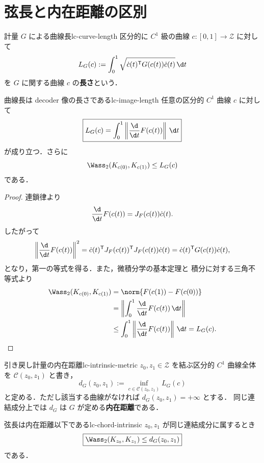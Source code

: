 \section{弦長と内在距離の区別}
\label{sec:lc-intrinsic-distance}

\begin{definition}{計量 $G$ による曲線長}{lc-curve-length}
  区分的に $C^1$ 級の曲線 $c\colon[0,1]\to\mathcal{Z}$ に対して
  \[
    L_G(c)
    :=\int_0^1
      \sqrt{\dot c(t)^{\mathsf T}G(c(t))\dot c(t)}\,\d t
  \]
  を $G$ に関する曲線 $c$ の\textbf{長さ}という．
\end{definition}

\begin{proposition}{曲線長は decoder 像の長さである}{lc-image-length}
  任意の区分的 $C^1$ 曲線 $c$ に対して
  \[
    \boxed{
      L_G(c)=\int_0^1\left\|\frac{\d}{\d t}F(c(t))\right\|\,\d t
    }
  \]
  が成り立つ．さらに
  \[
    \Wass_2(K_{c(0)},K_{c(1)})\leq L_G(c)
  \]
  である．
\end{proposition}

\begin{proof}
  連鎖律より
  \[
    \frac{\d}{\d t}F(c(t))=J_F(c(t))\dot c(t).
  \]
  したがって
  \[
    \left\|\frac{\d}{\d t}F(c(t))\right\|^2
    =\dot c(t)^{\mathsf T}J_F(c(t))^{\mathsf T}
      J_F(c(t))\dot c(t)
    =\dot c(t)^{\mathsf T}G(c(t))\dot c(t),
  \]
  となり，第一の等式を得る．また，微積分学の基本定理と
  積分に対する三角不等式より
  \[
    \begin{aligned}
      \Wass_2(K_{c(0)},K_{c(1)})
      &=\norm{F(c(1))-F(c(0))}\\
      &=\left\|\int_0^1\frac{\d}{\d t}F(c(t))\,\d t\right\|\\
      &\leq\int_0^1
        \left\|\frac{\d}{\d t}F(c(t))\right\|\,\d t
       =L_G(c).
    \end{aligned}
  \]
\end{proof}

\begin{definition}{引き戻し計量の内在距離}{lc-intrinsic-metric}
  $z_0,z_1\in\mathcal{Z}$ を結ぶ区分的 $C^1$ 曲線全体を
  $\mathcal{C}(z_0,z_1)$ と書き，
  \[
    d_G(z_0,z_1)
    :=\inf_{c\in\mathcal{C}(z_0,z_1)}L_G(c)
  \]
  と定める．ただし該当する曲線がなければ $d_G(z_0,z_1)=+\infty$ とする．
  同じ連結成分上では $d_G$ は $G$ が定める\textbf{内在距離}である．
\end{definition}

\begin{corollary}{弦長は内在距離以下である}{lc-chord-intrinsic}
  $z_0,z_1$ が同じ連結成分に属するとき
  \[
    \boxed{
      \Wass_2(K_{z_0},K_{z_1})\leq d_G(z_0,z_1)
    }
  \]
  である．
\end{corollary}

